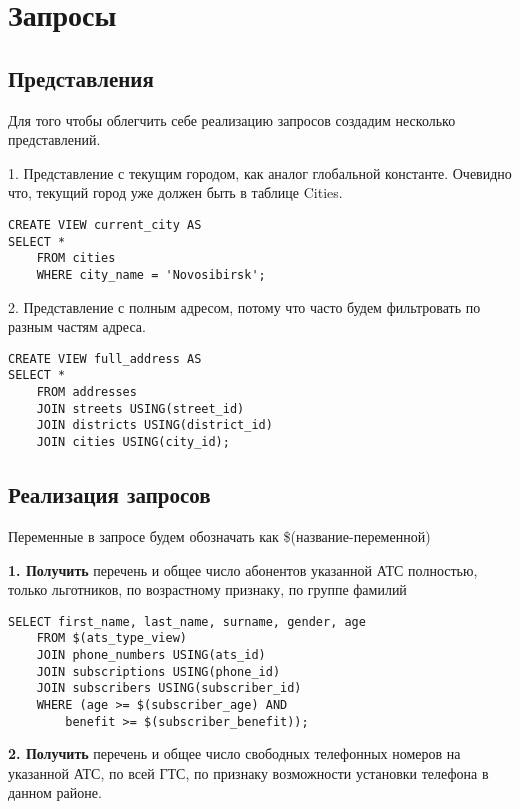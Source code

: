 \documentclass{report}
\begin{document}
\chapter{Запросы}

\section{Представления}

Для того чтобы облегчить себе реализацию запросов создадим несколько
представлений.

1. Представление с текущим городом, как аналог глобальной константе.
Очевидно что, текущий город уже должен быть в таблице Cities.

\begin{lstlisting}
CREATE VIEW current_city AS
SELECT *
    FROM cities 
    WHERE city_name = 'Novosibirsk'; 
\end{lstlisting}

2. Представление с полным адресом, потому что часто будем фильтровать
по разным частям адреса.

\begin{lstlisting}
CREATE VIEW full_address AS
SELECT *
    FROM addresses 
    JOIN streets USING(street_id)
    JOIN districts USING(district_id)
    JOIN cities USING(city_id);
\end{lstlisting}

\section{Реализация запросов}

Переменные в запросе будем обозначать как \$(название-переменной)

\textbf{1. Получить} перечень и общее число абонентов указанной АТС полностью, 
только льготников, по возрастному признаку, по группе фамилий

\begin{lstlisting}
SELECT first_name, last_name, surname, gender, age 
    FROM $(ats_type_view)
    JOIN phone_numbers USING(ats_id)
    JOIN subscriptions USING(phone_id)
    JOIN subscribers USING(subscriber_id)
    WHERE (age >= $(subscriber_age) AND
        benefit >= $(subscriber_benefit));
\end{lstlisting}

\textbf{2. Получить} перечень и общее число свободных телефонных 
номеров на указанной АТС, по всей ГТС, по признаку возможности установки 
телефона в данном районе.
\end{document}
